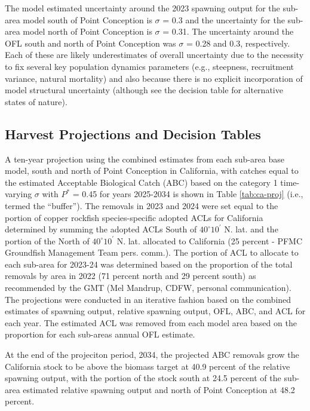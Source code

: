 \documentclass[11pt,
  english,
  letterpaper,
]{article}
\begin{document}
The model estimated uncertainty around the 2023 spawning output for the sub-area model south of Point Conception is \(\sigma\) = 0.3 and the uncertainty for the sub-area model north of Point Conception is \(\sigma\) = 0.31. The uncertainty around the OFL south and north of Point Conception was \(\sigma\) = 0.28 and 0.3, respectively. Each of these are likely underestimates of overall uncertainty due to the necessity to fix several key population dynamics parameters (e.g., steepness, recruitment variance, natural mortality) and also because there is no explicit incorporation of model structural uncertainty (although see the decision table for alternative states of nature).

\hypertarget{harvest-projections-and-decision-tables}{%
\subsection{Harvest Projections and Decision Tables}\label{harvest-projections-and-decision-tables}}

A ten-year projection using the combined estimates from each sub-area base model, south and north of Point Conception in California, with catches equal to the estimated Acceptable Biological Catch (ABC) based on the category 1 time-varying \(\sigma\) with \(P^*\) = 0.45 for years 2025-2034 is shown in Table \ref{tab:ca-proj} (i.e., termed the ``buffer''). The removals in 2023 and 2024 were set equal to the portion of copper rockfish species-specific adopted ACLs for California determined by summing the adopted ACLs South of $40^\circ 10^\prime$ N. lat. and the portion of the North of $40^\circ 10^\prime$ N. lat. allocated to California (25 percent - PFMC Groundfish Management Team pers. comm.). The portion of ACL to allocate to each sub-area for 2023-24 was determined based on the proportion of the total removals by area in 2022 (71 percent north and 29 percent south) as recommended by the GMT (Mel Mandrup, CDFW, personal communication). The projections were conducted in an iterative fashion based on the combined estimates of spawning output, relative spawning output, OFL, ABC, and ACL for each year. The estimated ACL was removed from each model area based on the proportion for each sub-areas annual OFL estimate.

At the end of the projeciton period, 2034, the projected ABC removals grow the California stock to be above the biomass target at 40.9 percent of the relative spawning output, with the portion of the stock south at 24.5 percent of the sub-area estimated relative spawning output and north of Point Conception at 48.2 percent.
\end{document}
